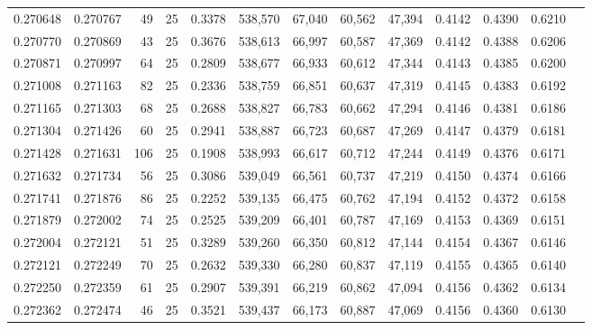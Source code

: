\begin{tabular}{rrrrrrrrrrrrr}
0.270648 & 0.270767 &    49 &  25 &                                     0.3378 & 538,570 &  67,040 &  60,562 &  47,394 & 0.4142 & 0.4390 & 0.6210 \\
0.270770 & 0.270869 &    43 &  25 &                                     0.3676 & 538,613 &  66,997 &  60,587 &  47,369 & 0.4142 & 0.4388 & 0.6206 \\
0.270871 & 0.270997 &    64 &  25 &                                     0.2809 & 538,677 &  66,933 &  60,612 &  47,344 & 0.4143 & 0.4385 & 0.6200 \\
0.271008 & 0.271163 &    82 &  25 &                                     0.2336 & 538,759 &  66,851 &  60,637 &  47,319 & 0.4145 & 0.4383 & 0.6192 \\
0.271165 & 0.271303 &    68 &  25 &                                     0.2688 & 538,827 &  66,783 &  60,662 &  47,294 & 0.4146 & 0.4381 & 0.6186 \\
0.271304 & 0.271426 &    60 &  25 &                                     0.2941 & 538,887 &  66,723 &  60,687 &  47,269 & 0.4147 & 0.4379 & 0.6181 \\
0.271428 & 0.271631 &   106 &  25 &                                     0.1908 & 538,993 &  66,617 &  60,712 &  47,244 & 0.4149 & 0.4376 & 0.6171 \\
0.271632 & 0.271734 &    56 &  25 &                                     0.3086 & 539,049 &  66,561 &  60,737 &  47,219 & 0.4150 & 0.4374 & 0.6166 \\
0.271741 & 0.271876 &    86 &  25 &                                     0.2252 & 539,135 &  66,475 &  60,762 &  47,194 & 0.4152 & 0.4372 & 0.6158 \\
0.271879 & 0.272002 &    74 &  25 &                                     0.2525 & 539,209 &  66,401 &  60,787 &  47,169 & 0.4153 & 0.4369 & 0.6151 \\
0.272004 & 0.272121 &    51 &  25 &                                     0.3289 & 539,260 &  66,350 &  60,812 &  47,144 & 0.4154 & 0.4367 & 0.6146 \\
0.272121 & 0.272249 &    70 &  25 &                                     0.2632 & 539,330 &  66,280 &  60,837 &  47,119 & 0.4155 & 0.4365 & 0.6140 \\
0.272250 & 0.272359 &    61 &  25 &                                     0.2907 & 539,391 &  66,219 &  60,862 &  47,094 & 0.4156 & 0.4362 & 0.6134 \\
0.272362 & 0.272474 &    46 &  25 &                                     0.3521 & 539,437 &  66,173 &  60,887 &  47,069 & 0.4156 & 0.4360 & 0.6130 \\

\end{tabular}
